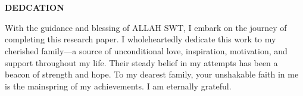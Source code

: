\newenvironment{dedication}
{%
    \thispagestyle{empty}%
    \vspace*{\stretch{1}}%
    \centering
    \justifying      %
}
{\par %
    \vspace{\stretch{3}} %
    \clearpage           %
}

\section*{}
\begin{dedication}
    \begin{center}
        {\textbf{DEDCATION}}
    \end{center}
    With the guidance and blessing of ALLAH SWT, I embark on the journey of
    completing this research paper. I wholeheartedly dedicate this work to my cherished
    family---a source of unconditional love, inspiration, motivation, and support
    throughout my life. Their steady belief in my attempts has been
    a beacon of strength and hope. To my dearest family, your unshakable faith in me
    is the mainspring of my achievements. I am eternally grateful.
\end{dedication}